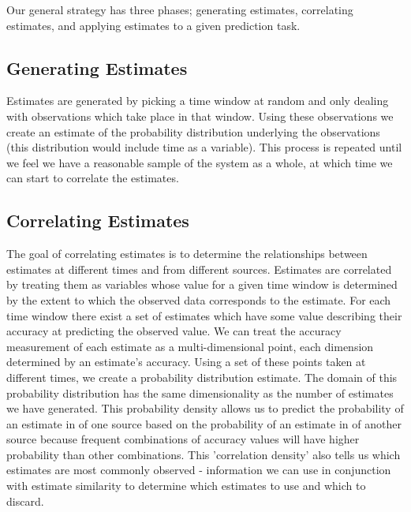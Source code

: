 \documentclass[10pt]{article}
\begin{document}
Our general strategy has three phases; generating estimates, correlating estimates, and applying estimates to a given prediction task.

\subsection{Generating Estimates}
Estimates are generated by picking a time window at random and only dealing with observations which take place in that window.  Using these observations we create an estimate of the probability distribution underlying the observations (this distribution would include time as a variable).  This process is repeated until we feel we have a reasonable sample of the system as a whole, at which time we can start to correlate the estimates.

\subsection{Correlating Estimates}
The goal of correlating estimates is to determine the relationships between estimates at different times and from different sources.  Estimates are correlated by treating them as variables whose value for a given time window is determined by the extent to which the observed data corresponds to the estimate.  For each time window there exist a set of estimates which have some value describing their accuracy at predicting the observed value.  We can treat the accuracy measurement of each estimate as a multi-dimensional point, each dimension determined by an estimate's accuracy.  Using a set of these points taken at different times, we create a probability distribution estimate.  The domain of this probability distribution has the same dimensionality as the number of estimates we have generated.  This probability density allows us to predict the probability of an estimate in of one source based on the probability of an estimate in of another source because frequent combinations of accuracy values will have higher probability than other combinations.  This 'correlation density' also tells us which estimates are most commonly observed - information we can use in conjunction with estimate similarity to determine which estimates to use and which to discard.
\end{document}
